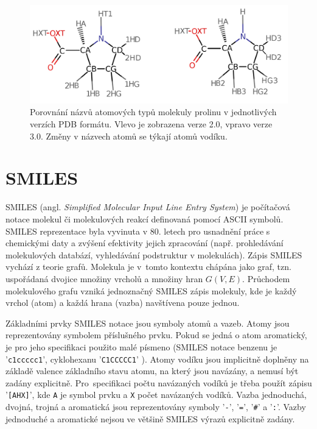 \begin{figure}[h]
\begin{center}
\includegraphics[width=12cm]{pictures/prolin_merged.png}
\caption{Porovnání názvů atomových typů molekuly prolinu v jednotlivých verzích PDB formátu. Vlevo je zobrazena verze 2.0, vpravo verze 3.0. Změny v názvech atomů se týkají atomů vodíku.}
\end{center}
\end{figure}

\section{SMILES}
SMILES \cite{Weininger, Bunin, Leach_chemo} (angl. \textit{Simplified Molecular Input Line Entry System}) je počítačová notace molekul či molekulových reakcí definovaná pomocí ASCII symbolů. SMILES reprezentace byla vyvinuta v 80. letech pro usnadnění práce s chemickými daty  a zvýšení efektivity jejich zpracování (např. prohledávání molekulových databází, vyhledávání podstruktur v molekulách). Zápis SMILES vychází z teorie grafů. Molekula je v~tomto kontextu chápána jako graf, tzn. uspořádaná dvojice množiny vrcholů a množiny hran $G(V,E)$. Průchodem molekulového grafu vzniká jednoznačný SMILES zápis molekuly, kde je každý vrchol (atom) a každá hrana (vazba) navštívena pouze jednou.

Základními prvky SMILES notace jsou symboly atomů a vazeb. Atomy jsou reprezentovány symbolem příslušného prvku. Pokud se jedná o atom aromatický, je pro jeho specifikaci použito malé písmeno (SMILES notace benzenu je '\verb|c1ccccc1|', cyklohexanu '\verb|C1CCCCC1|'
). Atomy vodíku jsou implicitně doplněny na základě valence základního stavu atomu, na který jsou navázány, a nemusí být  zadány explicitně. Pro~specifikaci počtu navázaných vodíků je třeba použít zápisu '\verb|[AHX]|', kde \verb|A| je symbol prvku a \verb|X| počet navázaných vodíků. Vazba jednoduchá, dvojná, trojná a aromatická jsou reprezentovány symboly '\verb|-|', '\verb|=|', '\verb|#|' a '\verb|:|'. Vazby jednoduché a aromatické nejsou ve většině SMILES výrazů explicitně zadány.

